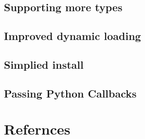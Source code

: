\documentclass[11pt, letterpaper, oneside, twocolumn] {article}
\begin{document}

\subsection{Supporting more types}


\subsection{Improved dynamic loading}


\subsection{Simplied install}


\subsection{Passing Python Callbacks}

\section{Refernces}

\end{document}

